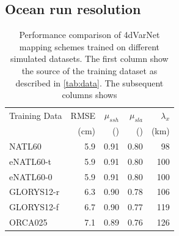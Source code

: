 \documentclass[draft]{agujournal2019}
\begin{document}
\subsection{Ocean run resolution}
\label{ssec:resolution}



\begin{table}[h]
\centering
\begin{tabular}{|l||rrrr|}
\toprule
Training Data & RMSE  & $\mu_{ssh}$  & $\mu_{sla}$ & $\lambda_x$  \\
 &  (cm) &  () &  () &  (km) \\
\midrule
NATL60 & 5.9  & 0.91  & 0.80  & 98 \\
eNATL60-t & 5.9  & 0.91  & 0.80  & 100 \\
eNATL60-0 & 5.9  & 0.91  & 0.80  & 100 \\
GLORYS12-r & 6.3  & 0.90  & 0.78  & 106 \\
GLORYS12-f & 6.7  & 0.90  & 0.77  & 119 \\
ORCA025 & 7.1  & 0.89  & 0.76  & 126 \\
\bottomrule
\end{tabular}
\label{tab:res}
\caption{Performance comparison of 4dVarNet mapping schemes trained on different simulated datasets. The first column show the source of the training dataset as described in \ref{tab:data}. The subsequent columns shows }
\end{table}
\end{document}
